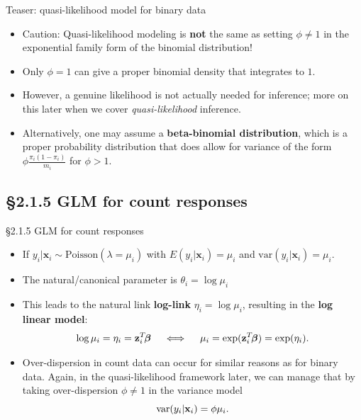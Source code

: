 \documentclass{beamer}
\newcommand{\currentsubsection}{}
\let\oldsubsection\subsection
\renewcommand{\subsection}[1]{\oldsubsection{#1}\renewcommand{\currentsubsection}{#1}}
\newcommand{\bx}{{\bf x}}
\newenvironment{wideitemize}%
  {\begin{itemize}%
    \setlength{\parskip}{1em}}%
  {\end{itemize}}
\begin{document}
\begin{frame}{Teaser: quasi-likelihood model for binary data}
\begin{wideitemize}


\item \alert{Caution}: Quasi-likelihood modeling is {\bf not} the same as setting $\phi \not= 1$ in the exponential family form of the binomial distribution! 

\item Only $\phi = 1$ can give a proper binomial density that integrates to $1$.


\item However, a genuine likelihood is not actually needed for inference; more on this later when we cover \emph{quasi-likelihood} inference. 




\item Alternatively, one  may assume  a \textbf{beta-binomial distribution}, which  is a proper probability distribution that does allow for variance of the form $\phi \frac{\pi_i(1-\pi_i)}{m_i}$ for $\phi >1$.
\end{wideitemize}

\end{frame}

\subsection{\S2.1.5 GLM for count responses}\label{sec:2.1.5}
\begin{frame}{\S2.1.5 GLM for count responses}
\begin{wideitemize}
\item
If $y_i|\textbf{x}_i \sim \mbox{Poisson}(\lambda=\mu_i)$ with $E(y_i|\textbf{x}_i)=\mu_i$
and $\mbox{var}(y_i|\textbf{x}_i)=\mu_i$.

\item The natural/canonical parameter is
$\theta_i=\log\mu_i$

\item This leads to the natural link  \textbf{log-link} $\eta_i=\log\mu_i$, resulting in
the \textbf{log linear model}:
\[
\log\mu_i=\eta_i=\textbf{z}_i^T\!\mbox{\boldmath $\beta$} \quad \iff \quad
\mu_i=\exp(\textbf{z}_i^T\!\mbox{\boldmath $\beta$})=\exp(\eta_i).
\]


\item Over-dispersion in count data can occur for similar reasons as for binary data. Again,   in the quasi-likelihood framework later, we can manage that by taking over-dispersion $\phi \not= 1$ in the variance model
\[
\text{var}(y_i |\bx_i) = \phi \mu_i.
\]



\end{wideitemize}
\end{frame}
\end{document}
